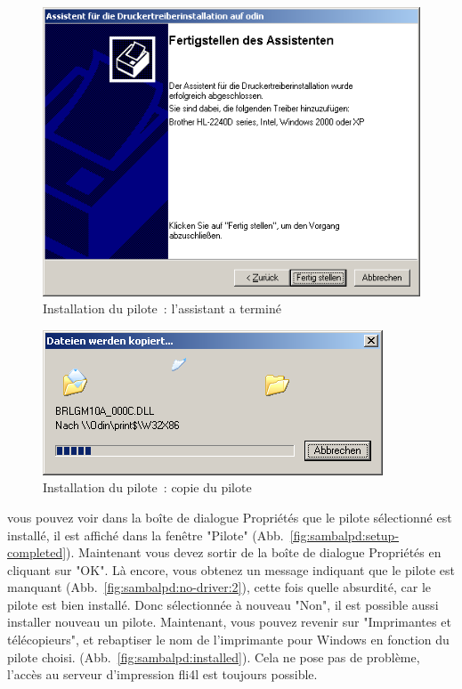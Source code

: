 \begin{figure}[hbt!]
\centering
\includegraphics[width=\columnwidth]{image013}
\caption{Installation du pilote~: l'assistant a terminé}
\label{fig:sambalpd:setup-end}
\end{figure}

\begin{figure}[hbt!]
\centering
\includegraphics[width=\columnwidth]{image014}
\caption{Installation du pilote~: copie du pilote}
\label{fig:sambalpd:driver-copy}
\end{figure}

vous pouvez voir dans la boîte de dialogue Propriétés que le pilote
sélectionné est installé, il est affiché dans la fenêtre "Pilote"
(Abb.~\ref{fig:sambalpd:setup-completed}). Maintenant vous devez sortir
de la boîte de dialogue Propriétés en cliquant sur "OK". Là encore,
vous obtenez un message indiquant que le pilote est manquant
(Abb.~\ref{fig:sambalpd:no-driver:2}), cette fois quelle absurdité,
car le pilote est bien installé. Donc sélectionnée à nouveau "Non",
il est possible aussi installer nouveau un pilote. Maintenant, vous pouvez
revenir sur "Imprimantes et télécopieurs", et rebaptiser le nom de
l'imprimante pour Windows en fonction du pilote choisi.
(Abb.~\ref{fig:sambalpd:installed}). Cela ne pose pas de problème,
l'accès au serveur d'impression fli4l est toujours possible.

